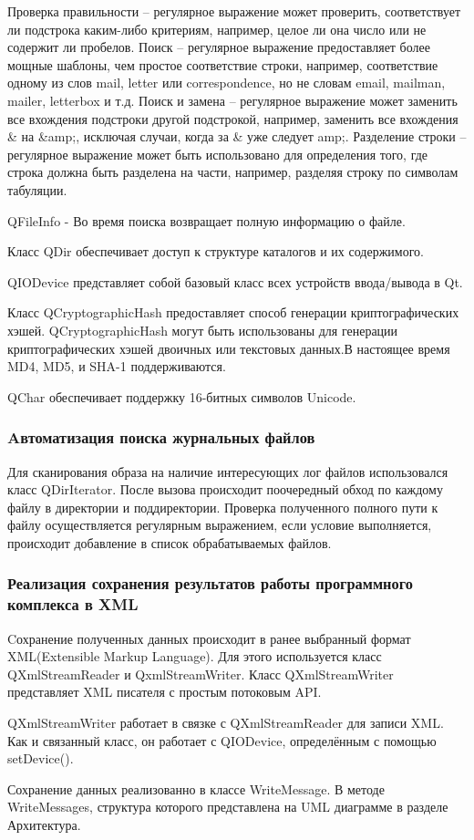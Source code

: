 Проверка правильности -- регулярное выражение может проверить, соответствует ли подстрока каким-либо критериям, например, целое ли она число или не содержит ли пробелов.
Поиск -- регулярное выражение предоставляет более мощные шаблоны, чем простое соответствие строки, например, соответствие одному из слов mail, letter или correspondence, но не словам email, mailman, mailer, letterbox и т.д.
Поиск и замена -- регулярное выражение может заменить все вхождения подстроки другой подстрокой, например, заменить все вхождения \& на \&amp;, исключая случаи, когда за \& уже следует amp;.
Разделение строки -- регулярное выражение может быть использовано для определения того, где строка должна быть разделена на части, например, разделяя строку по символам табуляции.

QFileInfo  - Во время поиска возвращает полную информацию о файле.

Класс QDir обеспечивает доступ к структуре каталогов и их содержимого.

QIODevice представляет собой базовый класс всех устройств ввода/вывода в Qt.

Класс QCryptographicHash предоставляет способ генерации криптографических хэшей.
QCryptographicHash могут быть использованы для генерации криптографических хэшей двоичных или текстовых данных.В настоящее время MD4, MD5, и SHA-1 поддерживаются. \cite{qtcross}

QChar обеспечивает поддержку 16-битных символов Unicode.

\subsubsection{Aвтоматизация поиска журнальных файлов}

Для сканирования образа на наличие интересующих лог файлов использовался класс QDirIterator. После вызова происходит поочередный обход по каждому файлу в директории и поддиректории. Проверка полученного полного пути к файлу осуществляется регулярным выражением, если условие выполняется, происходит добавление в список обрабатываемых файлов.

\subsubsection{Реализация сохранения результатов работы программного комплекса в XML}

Cохранение полученных данных происходит в ранее выбранный формат XML(Extensible Markup Language). Для этого используется класс QXmlStreamReader и QxmlStreamWriter.
Класс QXmlStreamWriter представляет XML писателя с простым потоковым API.

QXmlStreamWriter работает в связке с QXmlStreamReader для записи XML. Как и связанный класс, он работает с QIODevice, определённым с помощью setDevice().

Сохранение данных реализованно в классе WriteMessage. В методе WriteMessages, структура которого представлена на UML диаграмме в разделе Архитектура.
